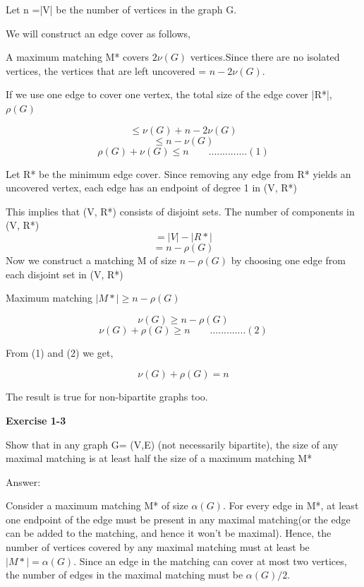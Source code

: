 \documentclass[twoside]{article}
\begin{document}
\begin{flushleft} Let n =|V| be the number of vertices in the  graph G.\end{flushleft}
\begin{flushleft}We will construct an edge cover  as follows,\end{flushleft}
\begin{flushleft}
A maximum matching M* covers $2\nu(G)$ vertices.Since there are no isolated vertices,  the vertices that are left uncovered =  $n- 2\nu(G)$. 
\end{flushleft}
\begin{flushleft}If we use one edge to cover one vertex, the total size of the edge cover |R*|, $\rho(G)$\end{flushleft}
$$\leq \nu(G) + n - 2\nu(G)$$
$$\leq n- \nu(G) $$
$$\rho(G) + \nu(G) \leq n \quad  \quad ..............(1)$$ 
\begin{flushleft} Let R* be the minimum edge cover. Since removing any edge from R* yields an uncovered vertex, each edge has an endpoint of degree 1 in (V, R*)  \end{flushleft}
\begin{flushleft} This implies that (V, R*) consists of disjoint sets. The number of components in (V, R*) $$= |V| - |R*| $$
$$= n -\rho(G) $$
Now we construct a matching M of size $n-\rho(G)$ by choosing one edge from each disjoint set in (V, R*)
 \end{flushleft}
 \begin{flushleft} Maximum matching $|M*| \geq n - \rho(G)$  \end{flushleft}
 $$ \nu(G) \geq n - \rho(G) $$
 $$ \nu(G) + \rho(G) \geq n \quad \quad .............(2) $$
 \begin{flushleft} From (1) and (2) we get, \end{flushleft}
 $$ \nu(G) + \rho(G) = n $$
\begin{flushleft} The result is true for non-bipartite graphs too. \end{flushleft}


\begin{flushleft}\textbf{Exercise 1-3}\end{flushleft}
\begin{flushleft} Show that in any graph G= (V,E) (not necessarily bipartite), the size of any maximal matching is at least half the size of a maximum matching M* \end{flushleft}
\begin{flushleft} Answer:\end{flushleft}
\begin{flushleft}
Consider a maximum matching M* of size $\alpha(G)$. For every edge in M*, at least one endpoint of the edge must be present in any maximal matching(or the edge can be added to the matching, and hence it won't be maximal). Hence, the number of vertices covered by any maximal matching must at least be $\mid M* \mid = \alpha(G)$. Since an edge in the matching can cover at most two vertices, the number of edges in the maximal matching must be $\alpha(G) /2$.
\end{flushleft}
\end{document}
